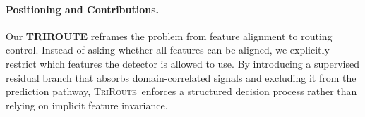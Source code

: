 \documentclass{article}
\newcommand{\method}{\textsc{TriRoute}}
\begin{document}
\vspace{-1em}
\paragraph{Positioning and Contributions.} Our \textbf{TRIROUTE} reframes the problem from feature alignment to routing control. Instead of asking whether all features can be aligned, we explicitly restrict which features the detector is allowed to use. By introducing a supervised residual branch that absorbs domain-correlated signals and excluding it from the prediction pathway, \method\ enforces a structured decision process rather than relying on implicit feature invariance.



\end{document}

